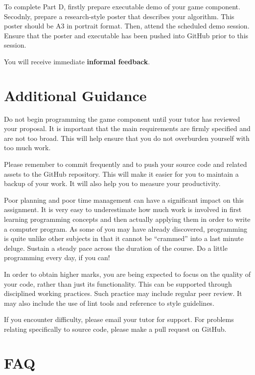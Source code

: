 \documentclass{../fal_assignment}
\begin{document}
To complete Part D, firstly prepare executable demo of your game component. Secodnly, prepare a research-style poster that describes your algorithm. This poster should be A3 in portrait format. Then, attend the scheduled demo session. Ensure that the poster and executable has been pushed into GitHub prior to this session. 

You will receive immediate \textbf{informal feedback}.

\section*{Additional Guidance}

Do not begin programming the game component until your tutor has reviewed your proposal. It is important that the main requirements are firmly specified and are not too broad. This will help ensure that you do not overburden yourself with too much work. 

Please remember to commit frequently and to push your source code and related assets to the GitHub repository. This will make it easier for you to maintain a backup of your work. It will also help you to measure your productivity.

Poor planning and poor time management can have a significant impact on this assignment. It is very easy to underestimate how much work is involved in first learning programming concepts and then actually applying them in order to write a computer program. As some of you may have already discovered, programming is quite unlike other subjects in that it cannot be ``crammed'' into a last minute deluge. Sustain a steady pace across the duration of the course. Do a little programming every day, if you can!

In order to obtain higher marks, you are being expected to focus on the quality of your code, rather than just its functionality. This can be supported through disciplined working practices. Such practice may include regular peer review. It may also include the use of lint tools and reference to style guidelines.

If you encounter difficulty, please email your tutor for support. For problems relating specifically to source code, please make a pull request on GitHub.

\section*{FAQ}
\end{document}

